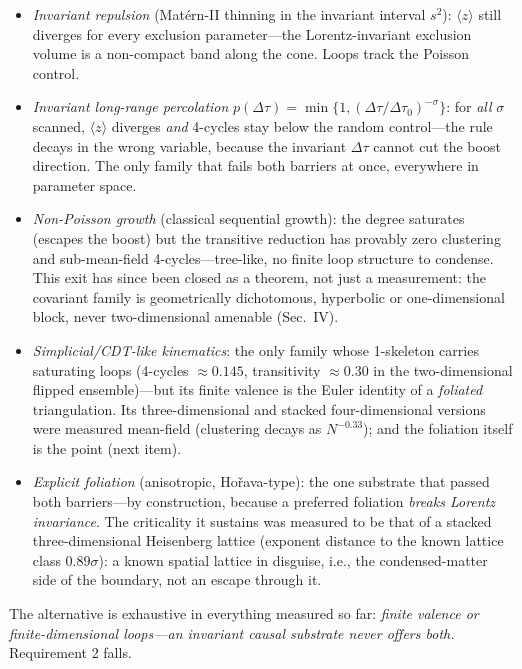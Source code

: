 \documentclass[aps,prd,reprint,nofootinbib,superscriptaddress,floatfix]{revtex4-2}
\begin{document}
\begin{itemize}
\item \emph{Invariant repulsion} (Mat\'ern-II thinning in the invariant interval
$s^2$): $\langle z\rangle$ still diverges for every exclusion parameter---the
Lorentz-invariant exclusion volume is a non-compact band along the cone. Loops track
the Poisson control.
\item \emph{Invariant long-range percolation} $p(\Delta\tau)=\min\{1,(\Delta\tau/
\Delta\tau_0)^{-\sigma}\}$: for \emph{all} $\sigma$ scanned, $\langle z\rangle$ diverges
\emph{and} 4-cycles stay below the random control---the rule decays in the wrong
variable, because the invariant $\Delta\tau$ cannot cut the boost direction. The only
family that fails both barriers at once, everywhere in parameter space.
\item \emph{Non-Poisson growth} (classical sequential growth): the degree saturates
(escapes the boost) but the transitive reduction has provably zero clustering and
sub-mean-field 4-cycles---tree-like, no finite loop structure to condense. This exit
has since been closed as a theorem, not just a measurement: the covariant family is
geometrically dichotomous, hyperbolic or one-dimensional block, never two-dimensional
amenable (Sec.~IV).
\item \emph{Simplicial/CDT-like kinematics}: the only family whose 1-skeleton carries
saturating loops (4-cycles $\approx 0.145$, transitivity $\approx 0.30$ in the
two-dimensional flipped ensemble)---but its finite valence is the Euler identity of a
\emph{foliated} triangulation. Its three-dimensional and stacked four-dimensional
versions were measured mean-field (clustering decays as $N^{-0.33}$); and the foliation
itself is the point (next item).
\item \emph{Explicit foliation} (anisotropic, Ho\v{r}ava-type): the one substrate that
passed both barriers---by construction, because a preferred foliation \emph{breaks
Lorentz invariance}. The criticality it sustains was measured to be that of a stacked
three-dimensional Heisenberg lattice (exponent distance to the known lattice class
$0.89\sigma$): a known spatial lattice in disguise, i.e., the condensed-matter side of
the boundary, not an escape through it.
\end{itemize}

The alternative is exhaustive in everything measured so far: \emph{finite valence or
finite-dimensional loops---an invariant causal substrate never offers both.}
Requirement 2 falls.
\end{document}
